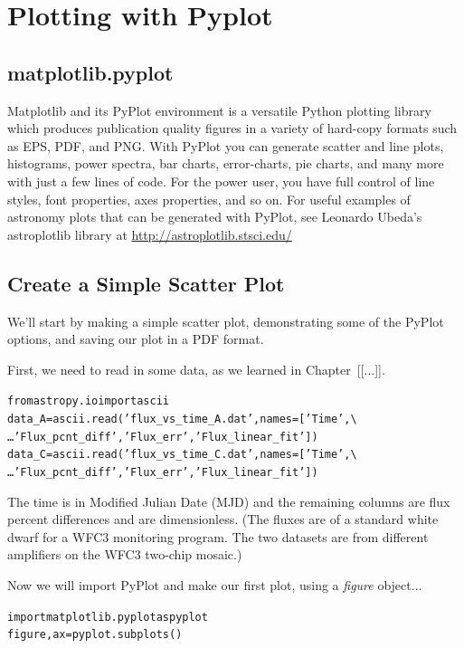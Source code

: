 \chapter{Plotting with Pyplot}
\label{ch:pyplot}

\section{matplotlib.pyplot}
Matplotlib and its PyPlot environment is a versatile Python plotting
library which produces publication quality figures in a variety of
hard-copy formats such as EPS, PDF, and PNG.  With PyPlot you can
generate scatter and line plots, histograms, power spectra, bar
charts, error-charts, pie charts, and many more with just a few lines
of code. For the power user, you have full control of line styles,
font properties, axes properties, and so on. For useful examples of 
astronomy plots that can be generated with PyPlot, see Leonardo 
Ubeda's astroplotlib library at \href{http://astroplotlib.stsci.edu/}
{http://astroplotlib.stsci.edu/}


\section{Create a Simple Scatter Plot}

We'll start by making a simple scatter plot, demonstrating some of 
the PyPlot options, and saving our plot in a PDF format. 

First, we need to read in some data, as we learned in Chapter~[[...]].

\begin{alltt}
\pytab from astropy.io import ascii
\pytab data_A = ascii.read('flux_vs_time_A.dat', names=['Time',  \textbackslash 
\ldots 'Flux_pcnt_diff', 'Flux_err', 'Flux_linear_fit'])
\pytab data_C = ascii.read('flux_vs_time_C.dat', names=['Time',  \textbackslash 
\ldots 'Flux_pcnt_diff', 'Flux_err', 'Flux_linear_fit'])
\end{alltt}

The time is in Modified Julian Date (MJD) and the remaining 
columns are flux percent differences and are dimensionless. 
(The fluxes are of a standard white dwarf for a WFC3 monitoring 
program. The two datasets are from different amplifiers
on the WFC3 two-chip mosaic.)

Now we will import PyPlot and make our first plot, 
using a \textit{figure} object...

\begin{alltt}
\pytab import matplotlib.pyplot as pyplot
\pytab figure, ax = pyplot.subplots()
\end{alltt}

